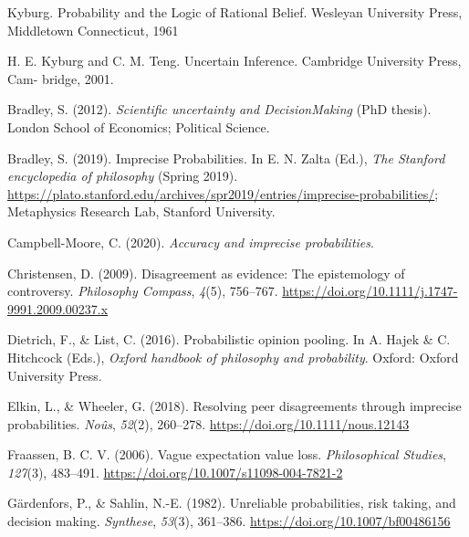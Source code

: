 \documentclass[
  10pt,
  dvipsnames,enabledeprecatedfontcommands]{scrartcl}
\newlength{\cslhangindent}
\newlength{\cslentryspacingunit} %
\newenvironment{CSLReferences}[2] %
 {%
  \setlength{\parindent}{0pt}
  \ifodd #1
  \let\oldpar\par
  \def\par{\hangindent=\cslhangindent\oldpar}
  \fi
  \setlength{\parskip}{#2\cslentryspacingunit}
 }%
 {}
\begin{document}
Kyburg. Probability and the Logic of Rational Belief. Wesleyan
University Press, Middletown Connecticut, 1961

H. E. Kyburg and C. M. Teng. Uncertain Inference. Cambridge University
Press, Cam- bridge, 2001.

\hypertarget{refs}{}
\begin{CSLReferences}{1}{0}
\leavevmode{}%
Bradley, S. (2012). \emph{Scientific uncertainty and DecisionMaking}
(PhD thesis). London School of Economics; Political Science.

\leavevmode{}%
Bradley, S. (2019). {Imprecise Probabilities}. In E. N. Zalta (Ed.),
\emph{The {Stanford} encyclopedia of philosophy} ({S}pring 2019).
\url{https://plato.stanford.edu/archives/spr2019/entries/imprecise-probabilities/};
Metaphysics Research Lab, Stanford University.

\leavevmode{}%
Campbell-Moore, C. (2020). \emph{Accuracy and imprecise probabilities}.

\leavevmode{}%
Christensen, D. (2009). Disagreement as evidence: The epistemology of
controversy. \emph{Philosophy Compass}, \emph{4}(5), 756--767.
\url{https://doi.org/10.1111/j.1747-9991.2009.00237.x}

\leavevmode{}%
Dietrich, F., \& List, C. (2016). Probabilistic opinion pooling. In A.
Hajek \& C. Hitchcock (Eds.), \emph{Oxford handbook of philosophy and
probability}. Oxford: Oxford University Press.

\leavevmode{}%
Elkin, L., \& Wheeler, G. (2018). Resolving peer disagreements through
imprecise probabilities. \emph{Noûs}, \emph{52}(2), 260--278.
\url{https://doi.org/10.1111/nous.12143}

\leavevmode{}%
Fraassen, B. C. V. (2006). Vague expectation value loss.
\emph{Philosophical Studies}, \emph{127}(3), 483--491.
\url{https://doi.org/10.1007/s11098-004-7821-2}

\leavevmode{}%
Gärdenfors, P., \& Sahlin, N.-E. (1982). Unreliable probabilities, risk
taking, and decision making. \emph{Synthese}, \emph{53}(3), 361--386.
\url{https://doi.org/10.1007/bf00486156}


\end{CSLReferences}
\end{document}
